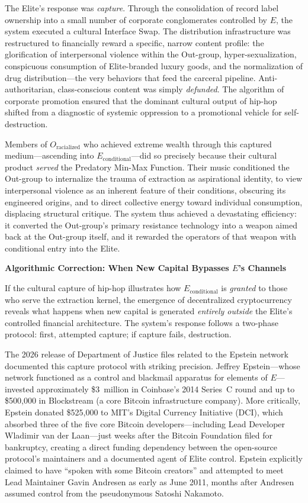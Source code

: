 The Elite's response was \textit{capture}. Through the consolidation of record label ownership into a small number of corporate conglomerates controlled by $E$, the system executed a cultural Interface Swap. The distribution infrastructure was restructured to financially reward a specific, narrow content profile: the glorification of interpersonal violence within the Out-group, hyper-sexualization, conspicuous consumption of Elite-branded luxury goods, and the normalization of drug distribution---the very behaviors that feed the carceral pipeline. Anti-authoritarian, class-conscious content was simply \textit{defunded}. The algorithm of corporate promotion ensured that the dominant cultural output of hip-hop shifted from a diagnostic of systemic oppression to a promotional vehicle for self-destruction.

Members of $O_{\text{racialized}}$ who achieved extreme wealth through this captured medium---ascending into $E_{\text{conditional}}$---did so precisely because their cultural product \textit{served} the Predatory Min-Max Function. Their music conditioned the Out-group to internalize the trauma of extraction as aspirational identity, to view interpersonal violence as an inherent feature of their conditions, obscuring its engineered origins, and to direct collective energy toward individual consumption, displacing structural critique. The system thus achieved a devastating efficiency: it converted the Out-group's primary resistance technology into a weapon aimed back at the Out-group itself, and it rewarded the operators of that weapon with conditional entry into the Elite.

\textbf{Algorithmic Correction: When New Capital Bypasses $E$'s Channels}

If the cultural capture of hip-hop illustrates how $E_{\text{conditional}}$ is \textit{granted} to those who serve the extraction kernel, the emergence of decentralized cryptocurrency reveals what happens when new capital is generated \textit{entirely outside} the Elite's controlled financial architecture. The system's response follows a two-phase protocol: first, attempted capture; if capture fails, destruction.

The 2026 release of Department of Justice files related to the Epstein network documented this capture protocol with striking precision. Jeffrey Epstein---whose network functioned as a control and blackmail apparatus for elements of $E$---invested approximately \$3~million in Coinbase's 2014 Series~C round and up to \$500,000 in Blockstream (a core Bitcoin infrastructure company). More critically, Epstein donated \$525,000 to MIT's Digital Currency Initiative (DCI), which absorbed three of the five core Bitcoin developers---including Lead Developer Wladimir van der Laan---just weeks after the Bitcoin Foundation filed for bankruptcy, creating a direct funding dependency between the open-source protocol's maintainers and a documented agent of Elite control. Epstein explicitly claimed to have ``spoken with some Bitcoin creators'' and attempted to meet Lead Maintainer Gavin Andresen as early as June 2011, months after Andresen assumed control from the pseudonymous Satoshi Nakamoto.

